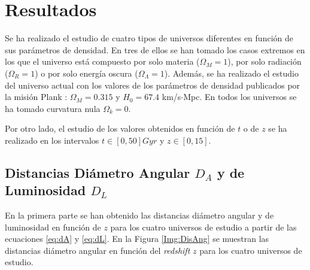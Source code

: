 \documentclass[twoside]{article}
\begin{document}
		\section{Resultados}

			Se ha realizado el estudio de cuatro tipos de universos diferentes en función de sus parámetros de densidad. En tres de ellos se han tomado los casos extremos en los que el universo está compuesto por solo materia ($\Omega_M = 1$), por solo radiación ($\Omega_R = 1$) o por solo energía oscura ($\Omega_\Lambda = 1$). Además, se ha realizado el estudio del universo actual con los valores de los parámetros de densidad publicados por la misión Plank \cite{Plank}: $\Omega_M = 0.315$ y $H_0 = 67.4$ km/s$\cdot$Mpc. En todos los universos se ha tomado curvatura nula $\Omega_k = 0$.

			Por otro lado, el estudio de los valores obtenidos en función de $t$ o de $z$ se ha realizado en los intervalos $t \in [0, 50] Gyr$ y $z \in [0, 15]$.

			\subsection{Distancias Diámetro Angular \texorpdfstring{$D_A$}{TEXT} y de Luminosidad \texorpdfstring{$D_L$}{TEXT}}
				\label{sec:dL-dA}

				En la primera parte se han obtenido las distancias diámetro angular y de luminosidad en función de $z$ para los cuatro universos de estudio a partir de las ecuaciones \ref{eq:dA} y \ref{eq:dL}. En la Figura \ref{Img:DisAng} se muestran las distancias diámetro angular en función del \textit{redshift} $z$ para los cuatro universos de estudio.
\end{document}
